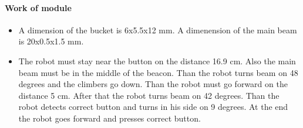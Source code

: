 	 \paragraph{Work of module}
	 
	 \begin{itemize}
	 
		 \item A dimension of the bucket is 6x5.5x12 mm. A dimenension of the main beam is 20x0.5x1.5 mm.
	 
		 \item The robot must stay near the button on the distance 16.9 cm. Also the main beam must be in the middle of the beacon. Than the robot turns beam on 48 degrees and the climbers go down. Than the robot must go forward on the distance 5 cm. After that the robot turns beam on 42 degrees. Than the robot detects correct button and turns in his side on 9 degrees. At the end the robot goes forward and presses correct button.
	\end{itemize}
	\fillpage
